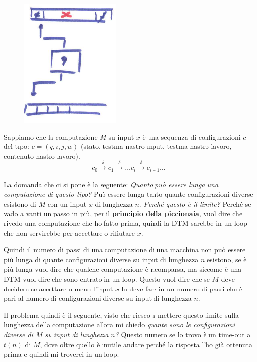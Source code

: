 \documentclass{article}
\begin{document}
\begin{figure}[H]
    \centering
    \includegraphics[scale=0.6]{images/comput_DTM_c.png}
\end{figure}

Sappiamo che la computazione $M$ su input $x$ è una sequenza di configurazioni $c$ del tipo: $c=(q,i,j,w)$ (stato,
testina nastro input, testina nastro lavoro, contenuto nastro lavoro).
$$c_0\overset{\delta}{\rightarrow}c_1\overset{\delta}{\rightarrow}\dots c_i\overset{\delta}{\rightarrow}c_{i+1}\dots$$

La domanda che
ci si pone è la seguente: \textit{Quanto può essere lunga una computazione di questo tipo?}
Può essere lunga tanto quante configurazioni diverse esistono di $M$ con un input $x$ di lunghezza $n$.
\textit{Perché questo è il limite?} Perché se vado a vanti un passo in più, per il \textbf{principio
    della piccionaia}, vuol dire che rivedo una computazione che ho fatto prima, quindi la DTM sarebbe
in un loop che non servirebbe per accettare o rifiutare $x$.

Quindi il numero di passi di una computazione di una macchina non può essere più lunga di quante
configurazioni diverse su input di lunghezza $n$ esistono, se è più lunga vuol dire che qualche
computazione è ricomparsa, ma siccome è una DTM vuol dire che sono entrato in un loop. Questo
vuol dire che se $M$ deve decidere se accettare o meno l'input $x$ lo deve fare in un numero di passi
che è pari al numero di configurazioni diverse su input di lunghezza $n$.

Il problema quindi è il seguente, visto che riesco a mettere questo limite sulla lunghezza della computazione
allora mi chiedo \textit{quante sono le configurazioni diverse di $M$ su input di lunghezza $n$?}
Questo numero se lo trovo è un time-out a $t(n)$ di $M$, dove oltre quello è inutile andare
perché la risposta l'ho già ottenuta prima e quindi mi troverei in un loop.
\end{document}
